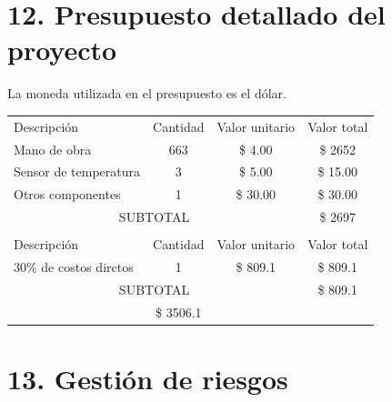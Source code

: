 \documentclass[
11pt, %
]{charter}
\begin{document}
\section{12. Presupuesto detallado del proyecto}
\label{sec:presupuesto}

La moneda utilizada en el presupuesto es el dólar.

\begin{table}[htpb]
\centering
\begin{tabularx}{\linewidth}{@{}|X|c|r|r|@{}}
\hline
\rowcolor[HTML]{C0C0C0} 
\multicolumn{4}{|c|}{\cellcolor[HTML]{C0C0C0}COSTOS DIRECTOS} \\ \hline
\rowcolor[HTML]{C0C0C0} 
Descripción &
  \multicolumn{1}{c|}{\cellcolor[HTML]{C0C0C0}Cantidad} &
  \multicolumn{1}{c|}{\cellcolor[HTML]{C0C0C0}Valor unitario} &
  \multicolumn{1}{c|}{\cellcolor[HTML]{C0C0C0}Valor total} \\ \hline
Mano de obra  &
  \multicolumn{1}{c|}{663} & 
  \multicolumn{1}{c|}{\$ 4.00} &
  \multicolumn{1}{c|}{\$ 2652} \\ \hline
Sensor de temperatura &
  \multicolumn{1}{c|}{3} &
  \multicolumn{1}{c|}{\$ 5.00} &
  \multicolumn{1}{c|}{\$ 15.00} \\ \hline
Otros componentes &
\multicolumn{1}{c|}{1} &
   \multicolumn{1}{c|}{\$ 30.00} &
   \multicolumn{1}{c|}{\$ 30.00} \\ \hline
\multicolumn{3}{|c|}{SUBTOTAL} &
  \multicolumn{1}{c|}{\$ 2697} \\ \hline
\rowcolor[HTML]{C0C0C0} 
\multicolumn{4}{|c|}{\cellcolor[HTML]{C0C0C0}COSTOS INDIRECTOS} \\ \hline
\rowcolor[HTML]{C0C0C0} 
Descripción &
  \multicolumn{1}{c|}{\cellcolor[HTML]{C0C0C0}Cantidad} &
  \multicolumn{1}{c|}{\cellcolor[HTML]{C0C0C0}Valor unitario} &
  \multicolumn{1}{c|}{\cellcolor[HTML]{C0C0C0}Valor total} \\ \hline
30\% de costos dirctos  &
\multicolumn{1}{c|}{1} &
\multicolumn{1}{c|}{\$ 809.1} &
\multicolumn{1}{c|}{\$ 809.1} \\ \hline

\multicolumn{3}{|c|}{SUBTOTAL} &
\multicolumn{1}{c|}{\$ 809.1} \\ \hline
\rowcolor[HTML]{C0C0C0}
\multicolumn{3}{|c|}{TOTAL} &
\multicolumn{1}{c|}{\$ 3506.1} \\ \hline
\end{tabularx}%
\end{table}


\section{13. Gestión de riesgos}
\label{sec:riesgos}
\end{document}
